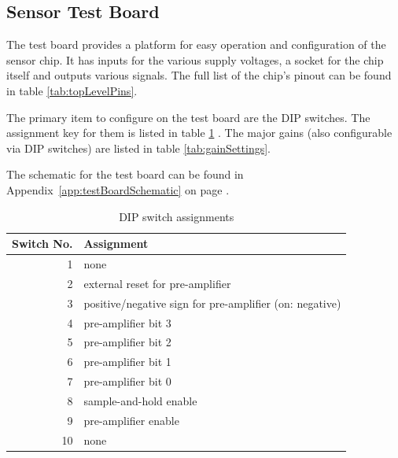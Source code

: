 \subsection{Sensor Test Board}
\label{subsec:testBoard}

The test board provides a platform for easy operation and configuration of the
sensor chip. It has  inputs for the various supply voltages,  a socket for the
chip itself  and outputs various signals. The  full list of the  chip's pinout
can be found in table \ref{tab:topLevelPins}.

The primary  item to  configure on  the test board  are the  DIP switches. The
assignment  key  for them  is  listed  in  table \ref{tab:dipSwitches}  .  The
major  gains  (also  configurable  via  DIP  switches)  are  listed  in  table
\ref{tab:gainSettings}.

The       schematic      for       the      test       board      can       be
found       in       Appendix~\ref{app:testBoardSchematic}       on       page
\pageref{app:testBoardSchematic}.

\begin{table}
    \centering
    \caption{DIP switch assignments}
    \label{tab:dipSwitches}
    \small
    \begin{tabular}{rl}
        \toprule
        Switch No. & Assignment \\
        \midrule
         1 & none \\
         2 & external reset for pre-amplifier \\
         3 & positive/negative sign for pre-amplifier (on: negative)\\
         4 & pre-amplifier bit 3 \\
         5 & pre-amplifier bit 2 \\
         6 & pre-amplifier bit 1 \\
         7 & pre-amplifier bit 0 \\
         8 & sample-and-hold enable \\
         9 & pre-amplifier enable \\
        10 & none \\
        \bottomrule
    \end{tabular}
\end{table}

